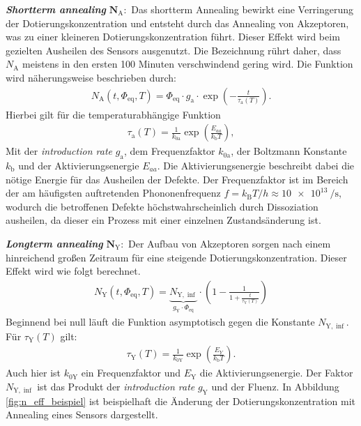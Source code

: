 \textbf{\textit{Shortterm annealing}} $\symbf{N_{\mathrm{A}}}:$ Das shortterm Annealing bewirkt eine Verringerung der Dotierungskonzentration und entsteht durch
das Annealing von Akzeptoren, was zu einer kleineren Dotierungskonzentration führt. Dieser Effekt wird beim
gezielten Ausheilen des Sensors ausgenutzt. Die Bezeichnung rührt daher, dass $N_{\mathrm{A}}$ meistens in den ersten 100 Minuten verschwindend gering wird. Die
Funktion wird näherungsweise beschrieben durch:
\begin{align}
  N_{\mathrm{A}}(t, \Phi_{\mathrm{eq}}, T) = \Phi_{\mathrm{eq}} \cdot g_{\mathrm{a}} \cdot \exp{\left(-\frac{t}{\tau_{\mathrm{a}}(T)}\right)}.
\end{align}
Hierbei gilt für die temperaturabhängige Funktion
\begin{align}
  \tau_{\mathrm{a}}(T) = \frac{1}{k_{0\mathrm{a}}}\exp{\left(\frac{E_{aa}}{k_{\mathrm{b}}T}\right)},
\end{align}
Mit der \textit{introduction rate} $g_{\mathrm{a}}$, dem Frequenzfaktor $k_{0\mathrm{a}}$, der Boltzmann Konstante $k_{\mathrm{b}}$ und
der Aktivierungsenergie $E_{aa}$. Die Aktivierungsenergie beschreibt dabei die nötige Energie für das Ausheilen der Defekte.
Der Frequenzfaktor ist im Bereich der am häufigsten auftretenden Phononenfrequenz ${f = k_{\mathrm{B}}T/h \approx \SI{10e13}{\per\second}}$, wodurch
die betroffenen Defekte höchstwahrscheinlich durch Dissoziation ausheilen, da dieser ein Prozess mit einer einzelnen Zustandsänderung ist.


\textbf{\textit{Longterm annealing}} $\symbf{N_{\mathrm{Y}}}:$ Der Aufbau von
Akzeptoren sorgen nach einem hinreichend großen Zeitraum für eine steigende
Dotierungskonzentration. Dieser Effekt wird wie folgt berechnet.
\begin{align}
  N_{\mathrm{Y}}(t, \Phi_{\mathrm{eq}}, T)     = \underbrace{N_{\mathrm{Y , \inf}}}_{g_{\mathrm{Y}}\cdot\Phi_{\mathrm{eq}}}\cdot \left(1 - \frac{1}{1 + \frac{t}{\tau_{\mathrm{Y}}(T)}}\right)
\end{align}
Beginnend bei null läuft die Funktion asymptotisch gegen die Konstante $N_{\mathrm{Y, \inf}}$.
Für $\tau_{\mathrm{Y}}(T)$ gilt:
\begin{align}
  \tau_{\mathrm{Y}}(T) = \frac{1}{k_{0\mathrm{Y}}}\exp{\left(\frac{E_{Y}}{k_{\mathrm{b}}T}\right)}.
\end{align}
Auch hier ist $k_{0\mathrm{Y}}$ ein Frequenzfaktor und $E_{\mathrm{Y}}$ die Aktivierungsenergie. Der Faktor $N_{\mathrm{Y , \inf}}$
ist das Produkt der \textit{introduction rate} $g_{\mathrm{Y}}$ und der Fluenz.
In Abbildung \ref{fig:n_eff_beispiel} ist beispielhaft die Änderung der Dotierungskonzentration mit Annealing eines
Sensors dargestellt.

